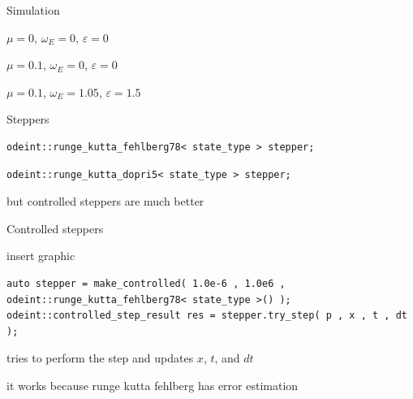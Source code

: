 \begin{frame}[fragile]
 Simulation

 $\mu=0$, $\omega_E = 0$, $\varepsilon=0$

 $\mu=0.1$, $\omega_E = 0$, $\varepsilon=0$

 $\mu=0.1$, $\omega_E = 1.05$, $\varepsilon=1.5$
\end{frame}

\begin{frame}[fragile]

  Steppers
  \begin{lstlisting}
odeint::runge_kutta_fehlberg78< state_type > stepper;
  \end{lstlisting}

  \begin{lstlisting}
odeint::runge_kutta_dopri5< state_type > stepper;
  \end{lstlisting}

  but controlled steppers are much better

\end{frame}

\begin{frame}[fragile]
 Controlled steppers

 insert graphic

 \begin{lstlisting}
auto stepper = make_controlled( 1.0e-6 , 1.0e6 ,  odeint::runge_kutta_fehlberg78< state_type >() );
odeint::controlled_step_result res = stepper.try_step( p , x , t , dt );
 \end{lstlisting}

 tries to perform the step and updates $x$, $t$, and $dt$

 it works because runge kutta fehlberg has error estimation

\end{frame}


